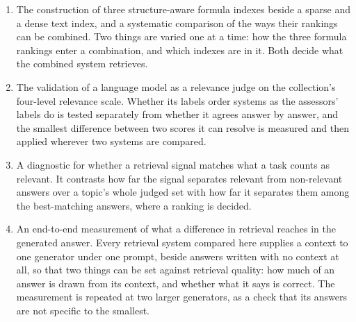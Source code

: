 \begin{enumerate}[leftmargin=1.7em,itemsep=0.7em,topsep=0.5em]

\item The construction of three structure-aware formula indexes beside a sparse and a dense text
index, and a systematic comparison of the ways their rankings can be combined. Two things are
varied one at a time: how the three formula rankings enter a combination, and which indexes are in
it. Both decide what the combined system retrieves.

\item The validation of a language model as a relevance judge on the collection's four-level
relevance scale. Whether its labels order systems as the assessors' labels do is tested separately
from whether it agrees answer by answer, and the smallest difference between two scores it can
resolve is measured and then applied wherever two systems are compared.

\item A diagnostic for whether a retrieval signal matches what a task counts as relevant. It
contrasts how far the signal separates relevant from non-relevant answers over a topic's whole
judged set with how far it separates them among the best-matching answers, where a ranking is
decided.

\item An end-to-end measurement of what a difference in retrieval reaches in the generated answer.
Every retrieval system compared here supplies a context to one generator under one prompt, beside
answers written with no context at all, so that two things can be set against retrieval quality:
how much of an answer is drawn from its context, and whether what it says is correct. The
measurement is repeated at two larger generators, as a check that its answers are not specific to
the smallest.

\end{enumerate}

